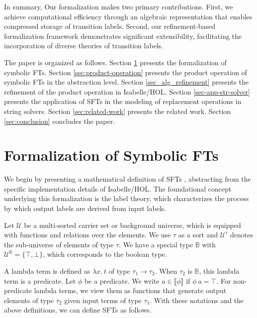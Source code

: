 \documentclass[a4paper,UKenglish,cleveref, autoref, anonymous, thm-restate]{lipics-v2021}
\begin{document}
In summary, Our formalization makes two primary contributions. First, we achieve computational efficiency through an algebraic representation that enables compressed storage of transition labels. Second, our refinement-based formalization framework demonstrates significant extensibility, facilitating the incorporation of diverse theories of transition labels.



The paper is organized as follows.
Section \ref{sec:formalization} presents the formalization of symbolic FTs.
Section \ref{sec:product-operation} presents the product operation of symbolic FTs in the abstraction level.
Section \ref{sec_alg_refinement} presents the refinement of the product operation in Isabelle/HOL.
Section \ref{sec-app-str-solver} presents the application of SFTs in the modeling of replacement operations in string solvers.
Section \ref{sec:related-work} presents the related work.
Section \ref{sec:conclusion} concludes the paper. 




\section{Formalization of Symbolic FTs}
\label{sec:formalization}


We begin by presenting a mathematical definition of SFTs \cite{VeanesHLMB12Transducer}, abstracting from the specific implementation details of Isabelle/HOL. The foundational concept underlying this formalization is the label theory, which characterizes the process by which output labels are derived from input labels.


Let $\mathcal{U}$ be a multi-sorted carrier set or background universe, which is equipped with functions and relations over the elements. We use $\tau$ as a sort and $\mathcal{U}^\tau$ denotes the sub-universe of elements of type $\tau$. 
We have a special type $\mathbb{B}$ with $\mathcal{U}^\mathbb{B} = \{ \top, \bot\}$, which corresponds to the boolean type. 

A lambda term is defined as $\lambda x.~t$ of type $\tau_1 \rightarrow \tau_2$.
When $\tau_2$ is $\mathbb{B}$, this lambda term is a predicate. Let $\phi$ be a predicate. We write $a\in \llbracket\phi \rrbracket$ if $\phi~a=\top$. For non-predicate lambda terms, we view them as functions that generate output elements of type $\tau_2$ given input terms of type $\tau_1$. 
With these notations and the above definitions, we can define SFTs as follows.
\end{document}
